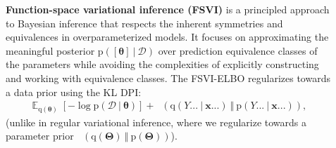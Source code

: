\documentclass[25pt,a0paper,landscape]{tikzposter}
\DeclareMathOperator{\opExpectation}{\mathbb{E}}
\newcommand{\E}[2]{\opExpectation_{#1} \left [ #2 \right ]}
\newcommand{\MidSymbol}[1][]{\:#1\:}
\newcommand{\given}{\MidSymbol[\vert]}
\DeclareMathOperator{\opEntropy}{H}
\newcommand{\xHof}[1]{\opEntropy(#1)}
\DeclareMathOperator{\opKale}{D_\mathrm{KL}}
\newcommand{\Kale}[2]{\opKale(#1 \MidSymbol[\Vert] #2)}
\newcommand{\opp}{\mathrm{p}}
\newcommand{\pof}[1]{\opp(#1)}
\newcommand{\opq}{\mathrm{q}}
\newcommand{\qof}[1]{\opq(#1)}
\newcommand{\w}{\boldsymbol{\theta}}
\newcommand{\W}{\boldsymbol{\Theta}}
\newcommand{\Dany}{\mathcal{D}}
\newcommand{\Y}{Y}
\newcommand{\x}{\boldsymbol{x}}
\begin{document}
\begin{columns}
\begin{subcolumns}
\end{subcolumns}
{
  \begin{tldrbox}
    \textbf{Function-space variational inference (FSVI)} is a principled approach to Bayesian inference that respects the inherent symmetries and equivalences in overparameterized models. It focuses on approximating the meaningful posterior $\pof{[\w] \given \Dany}$ over prediction equivalence classes of the parameters while avoiding the complexities of explicitly constructing and working with equivalence classes.
    The FSVI-ELBO regularizes towards a data prior using the KL DPI:
    \begin{align*}
    \E{\qof{\w}}{-\log \pof{\Dany \given \w}} + \Kale{\qof{\Y... \given \x...}}{\pof{\Y... \given \x...}},
    \end{align*}
    (unlike in regular variational inference, where we regularize towards a parameter prior $\Kale{\qof{\W}}{\pof{\W}}$).
  \end{tldrbox}
  \begin{multicols}{2}
    \begin{backgroundbox}[title=(Regular) Variational Inference \& ELBO]

\end{backgroundbox}
\end{multicols}}
\end{columns}
\end{document}

